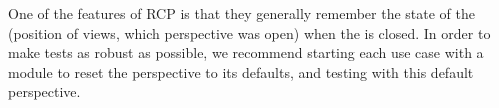 
One of the features of RCP \gdauts{} is that they generally remember the state of the \gdaut{} (position of views, which perspective was open) when the \gdaut{} is closed. In order to make tests as robust as possible, we recommend starting each use case with a module to reset the perspective to its defaults, and testing with this default perspective. 
